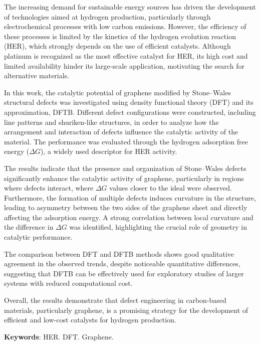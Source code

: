 \documentclass[
  12pt,
  oneside,
  a4paper,
  chapter=TITLE,
  section=TITLE,
  brazil
]{abntex2}
\begin{document}
\begin{resumo}[Abstract]
The increasing demand for sustainable energy sources has driven the development of technologies aimed at hydrogen production, particularly through electrochemical processes with low carbon emissions. However, the efficiency of these processes is limited by the kinetics of the hydrogen evolution reaction (HER), which strongly depends on the use of efficient catalysts. Although platinum is recognized as the most effective catalyst for HER, its high cost and limited availability hinder its large-scale application, motivating the search for alternative materials.

In this work, the catalytic potential of graphene modified by Stone–Wales structural defects was investigated using density functional theory (DFT) and its approximation, DFTB. Different defect configurations were constructed, including line patterns and shuriken-like structures, in order to analyze how the arrangement and interaction of defects influence the catalytic activity of the material. The performance was evaluated through the hydrogen adsorption free energy ($\Delta G$), a widely used descriptor for HER activity.

The results indicate that the presence and organization of Stone–Wales defects significantly enhance the catalytic activity of graphene, particularly in regions where defects interact, where $\Delta G$ values closer to the ideal were observed. Furthermore, the formation of multiple defects induces curvature in the structure, leading to asymmetry between the two sides of the graphene sheet and directly affecting the adsorption energy. A strong correlation between local curvature and the difference in $\Delta G$ was identified, highlighting the crucial role of geometry in catalytic performance.

The comparison between DFT and DFTB methods shows good qualitative agreement in the observed trends, despite noticeable quantitative differences, suggesting that DFTB can be effectively used for exploratory studies of larger systems with reduced computational cost.

Overall, the results demonstrate that defect engineering in carbon-based materials, particularly graphene, is a promising strategy for the development of efficient and low-cost catalysts for hydrogen production.

\textbf{Keywords}: HER. DFT. Graphene.
\end{resumo}

\tableofcontents
\listoffigures
\listoftables

\textual








\end{document}
